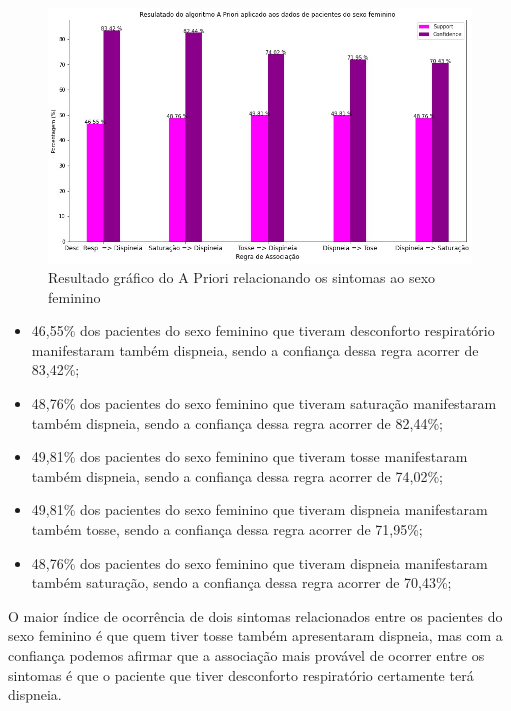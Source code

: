 \documentclass[tcc1]{uftex}
\begin{document}
    \begin{figure}[!h]
    \centering
    \includegraphics[width=12cm]{AprioriIMG_sexo_feminino.jpg}
    \caption{Resultado gráfico do A Priori relacionando os sintomas ao sexo feminino}
    \end{figure}
    
    \begin{itemize}
    \item 46,55\% dos pacientes do sexo feminino que tiveram desconforto respiratório manifestaram também dispneia, sendo a confiança dessa regra acorrer de 83,42\%;
    
    \item 48,76\% dos pacientes do sexo feminino que tiveram saturação manifestaram também dispneia, sendo a confiança dessa regra acorrer de 82,44\%;
    
    \item 49,81\% dos pacientes do sexo feminino que tiveram tosse manifestaram também dispneia, sendo a confiança dessa regra acorrer de 74,02\%;
    
    \item 49,81\% dos pacientes do sexo feminino que tiveram dispneia manifestaram também tosse, sendo a confiança dessa regra acorrer de 71,95\%;
    
    \item 48,76\% dos pacientes do sexo feminino que tiveram dispneia manifestaram também saturação, sendo a confiança dessa regra acorrer de 70,43\%;
    \end{itemize}
    
      O maior índice de ocorrência de dois sintomas relacionados entre os pacientes do sexo feminino é que quem tiver tosse também apresentaram dispneia, mas com a confiança podemos afirmar que a associação mais provável de ocorrer entre os sintomas é que o paciente que tiver desconforto respiratório certamente terá dispneia.
    
\end{document}
